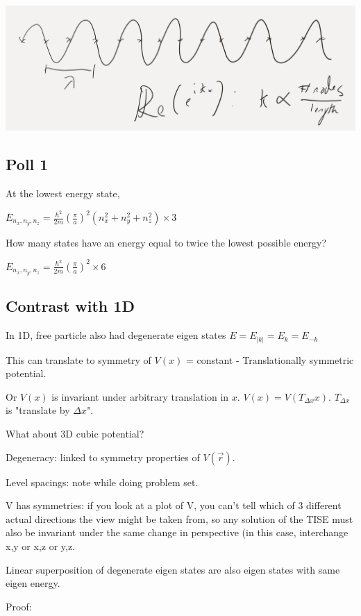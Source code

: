 \documentclass{article}
\begin{document}
\includegraphics[width = 0.9 \textwidth]{Lecture19/2.png}

\subsection{Poll 1}

At the lowest energy state, 

$E_{n_x, n_y, n_z} = \frac{\hbar^2}{2m} \left( \frac{\pi}{a} \right)^2 (n_x^2 + n_y^2 + n_z^2) \times 3$

How many states have an energy equal to twice the lowest possible energy?

$E_{n_x, n_y, n_z} = \frac{\hbar^2}{2m} \left( \frac{\pi}{a} \right)^2 \times 6$

\subsection{Contrast with 1D}

In 1D, free particle also had degenerate eigen states $E = E_{|k|} = E_k = E_{-k}$

This can translate to symmetry of $V(x)$ = constant - Translationally symmetric potential. 

Or $V(x)$ is invariant under arbitrary translation in $x$. $V(x) = V(T_{\Delta x} x)$. $T_{\Delta x}$ is "translate by $\Delta x$". 

What about 3D cubic potential?

Degeneracy: linked to symmetry properties of $V(\vec{r})$. 

Level spacings: note while doing problem set. 

V has symmetries: if you look at a plot of V, you can’t tell which of 3 different actual directions the view might be taken from, so any solution of the TISE must also be invariant under the same change in perspective (in this case, interchange x,y or x,z or y,z.

Linear superposition of degenerate eigen states are also eigen states with same eigen energy. 

Proof: 
\end{document}
